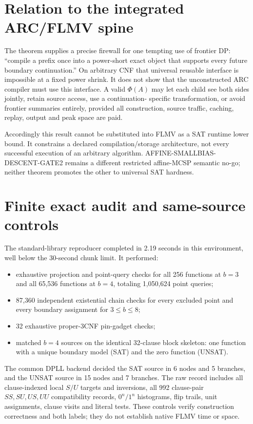 \documentclass[11pt]{article}
\begin{document}
\section{Relation to the integrated ARC/FLMV spine}
The theorem supplies a precise firewall for one tempting use of frontier DP:
``compile a prefix once into a power-short exact object that supports every
future boundary continuation.''  On arbitrary CNF that universal reusable
interface is impossible at a fixed power shrink.  It does not show that the
unconstructed ARC compiler must use this interface.  A valid $\Phi(A)$ may let
each child see both sides jointly, retain source access, use a continuation-
specific transformation, or avoid frontier summaries entirely, provided all
construction, source traffic, caching, replay, output and peak space are paid.

Accordingly this result cannot be substituted into FLMV as a SAT runtime lower
bound.  It constrains a declared compilation/storage architecture, not every
successful execution of an arbitrary algorithm.  AFFINE-SMALLBIAS-DESCENT-GATE2
remains a different restricted affine-MCSP semantic no-go; neither theorem
promotes the other to universal SAT hardness.

\section{Finite exact audit and same-source controls}
The standard-library reproducer completed in 2.19 seconds in this environment,
well below the 30-second chunk limit.  It performed:
\begin{itemize}
\item exhaustive projection and point-query checks for all 256 functions at
$b=3$ and all 65,536 functions at $b=4$, totaling 1,050,624 point queries;
\item 87,360 independent existential chain checks for every excluded point and
every boundary assignment for $3\le b\le8$;
\item 32 exhaustive proper-3CNF pin-gadget checks;
\item matched $b=4$ sources on the identical 32-clause block skeleton: one
function with a unique boundary model (SAT) and the zero function (UNSAT).
\end{itemize}

The common DPLL backend decided the SAT source in 6 nodes and 5 branches, and
the UNSAT source in 15 nodes and 7 branches.  The raw record includes all
clause-indexed local $S/U$ targets and inversions, all 992 clause-pair
$SS,SU,US,UU$ compatibility records, $0^n/1^n$ histograms, flip trails, unit
assignments, clause visits and literal tests.  These controls verify construction
correctness and both labels; they do not establish native FLMV time or space.
\end{document}
